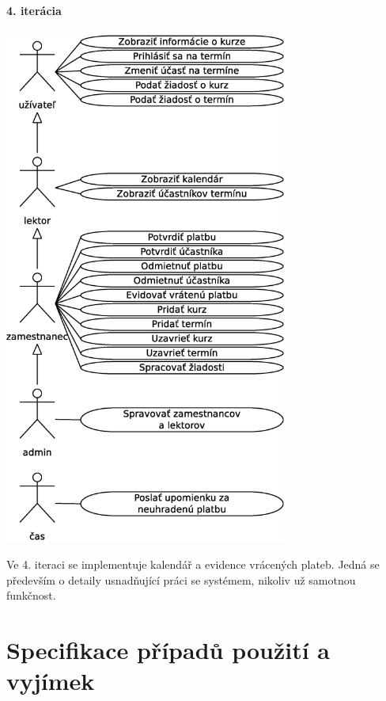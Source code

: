 \documentclass[12pt,a4paper,titlepage,final]{report}
\begin{document}
	\subsubsection{4. iterácia}
		\begin{center}
			\captionsetup{type=figure}
			\includegraphics[height=17cm]{img/use_case.eps}
		\end{center}
		
Ve 4. iteraci se implementuje kalendář a evidence vrácených plateb. Jedná se především o detaily usnadňující práci se systémem, nikoliv už samotnou funkčnost.









\chapter{Specifikace případů použití a vyjímek}
\end{document}
